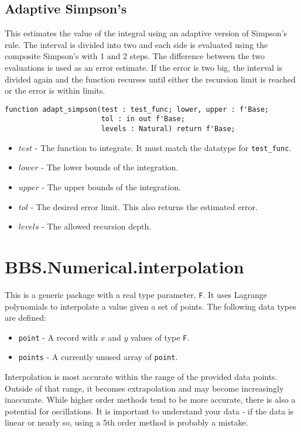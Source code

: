 \documentclass[10pt, openany]{book}
\newcommand{\datatype}[1]{\texttt{#1}}
\begin{document}
\subsection{Adaptive Simpson's}
This estimates the value of the integral using an adaptive version of Simpson's rule.  The interval is divided into two and each side is evaluated using the composite Simpson's with 1 and 2 steps.  The difference between the two evaluations is used as an error estimate.  If the error is two big, the interval is divided again and the function recurses until either the recursion limit is reached or the error is within limits.
\begin{lstlisting}
function adapt_simpson(test : test_func; lower, upper : f'Base;
                       tol : in out f'Base;
                       levels : Natural) return f'Base;
\end{lstlisting}
\begin{itemize}
  \item $test$ - The function to integrate.  It must match the datatype for \datatype{test\_func}.
  \item $lower$ - The lower bounds of the integration.
  \item $upper$ - The upper bounds of the integration.
  \item $tol$ - The desired error limit.  This also returns the estimated error.
  \item $levels$ - The allowed recursion depth.
\end{itemize}

\section{BBS.Numerical.interpolation}
This is a generic package with a real type parameter, \datatype{F}.  It uses Lagrange polynomials to interpolate a value given a set of points.  The following data types are defined:
\begin{itemize}
  \item \datatype{point} - A record with $x$ and $y$ values of type \datatype{F}.
  \item \datatype{points} - A currently unused array of \datatype{point}.
\end{itemize}
Interpolation is most accurate within the range of the provided data points.  Outside of that range, it becomes extrapolation and may become increasingly inaccurate.  While higher order methods tend to be more accurate, there is also a potential for oscillations.  It is important to understand your data - if the data is linear or nearly so, using a 5th order method is probably a mistake.
\end{document}
